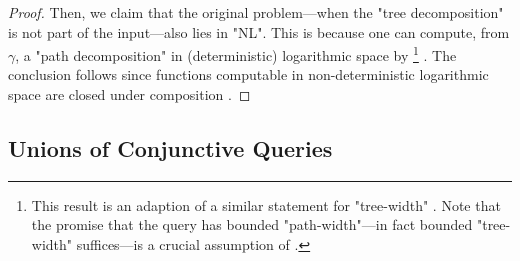 \begin{proof}
	Then, we claim that the original problem---when the "tree decomposition" is not part of 
	the input---also lies in "NL". This is because one can compute, from $\gamma$, a
	"path decomposition" in (deterministic) logarithmic space by%
	\footnote[][-2cm]{This result is an 
	adaption of a similar statement for "tree-width" \cite[Theorem I.1, p. 143]{ElberfeldJakobyTantau2010Logspace}. Note that the promise that the query has bounded "path-width"---in fact bounded "tree-width" suffices---is a crucial assumption of  \cite[Theorem I.1, p. 143]{ElberfeldJakobyTantau2010Logspace}.} 
	\cite[Theorem 1.3, p. 2]{KintaliMunteanu2010Computing}.
	The conclusion follows since functions computable in non-deterministic logarithmic space
	are closed under composition \cite[Lemma 4.17, p. 88]{AroraBarak2009ComputationalComplexity}. 
\end{proof}

\subsection{Unions of Conjunctive Queries}
\label{sec:prelim-db-ucq}

